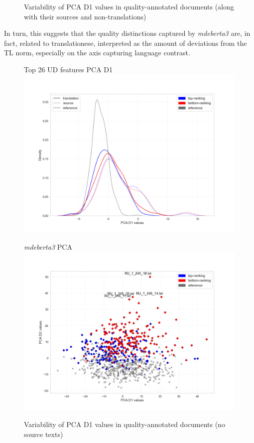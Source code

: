 \begin{figure}[H]
\begin{minipage}[c]{0.5\linewidth}
	\end{minipage}
	\caption{\label{fig:pca_qua}Variability of PCA D1 values in quality-annotated documents (along with their sources and non-translations)}	
\end{figure}   

In turn, this suggests that the quality distinctions captured by \textit{mdeberta3} are, in fact, related to translationese, interpreted as the amount of deviations from the TL norm, especially on the axis capturing language contrast.
\begin{figure}[H]
	\begin{minipage}[c]{0.5\linewidth}
		\centering
		Top 26 UD features PCA D1
		\includegraphics[width=\linewidth]{figures/pca/src-bad-good-pca-ud26-D1-lines}
	\end{minipage}	
	\begin{minipage}[c]{0.5\linewidth}
		\centering
		\textit{mdeberta3} PCA
		\includegraphics[width=\linewidth]{figures/pca/qua-ttype-mdeberta3-base-PCA-scatter}
	\end{minipage}
	\caption{\label{fig:pca_qua26}Variability of PCA D1 values in quality-annotated documents (no source texts)}	
\end{figure}
